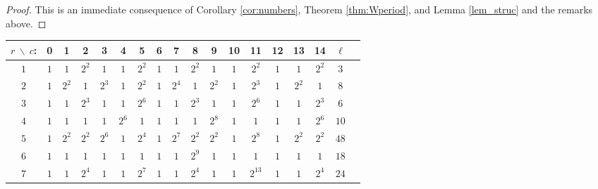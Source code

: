 \begin{proof}
This is an immediate consequence of Corollary \ref{cor:numbers},
Theorem \ref{thm:Wperiod}, and Lemma \ref{lem_struc} and the remarks
above.
\end{proof}

\begin{table}\label{tab:n4}
  \begin{center}
    \begin{adjustbox}{max width=\textwidth}
    \begin{tabular}{|c|cccccccccccccccc|c|}
      \hline
$r\ \backslash\ c$:&0 &1 &2 &3 &4 &5 &6 &7 &8 &9 &10 &11 &12 &13 &14  &$\ell$
\\
      \hline
$1$ &$1$ &$1$ &$2^2$ &$1$ &$1$ &$2^2$ &$1$ &$1$ &$2^2$ &$1$ &$1$ &$2^2$ &$1$ &$1$ &$2^2$ &$3$ \\
$2$ &$1$ &$2^2$ &$1$ &$2^3$ &$1$ &$2^2$ &$1$ &$2^4$ &$1$ &$2^2$ &$1$ &$2^3$ &$1$ &$2^2$ &$1$ &$8$ \\
$3$ &$1$ &$1$ &$2^3$ &$1$ &$1$ &$2^6$ &$1$ &$1$ &$2^3$ &$1$ &$1$ &$2^6$ &$1$ &$1$ &$2^3$ &$6$ \\
$4$ &$1$ &$1$ &$1$ &$1$ &$2^6$ &$1$ &$1$ &$1$ &$1$ &$2^8$ &$1$ &$1$ &$1$ &$1$ &$2^6$ &$10$ \\
$5$ &$1$ &$2^2$ &$2^2$ &$2^6$ &$1$ &$2^4$ &$1$ &$2^7$ &$2^2$ &$2^2$ &$1$ &$2^8$ &$1$ &$2^2$ &$2^2$ &$48$ \\
$6$ &$1$ &$1$ &$1$ &$1$ &$1$ &$1$ &$1$ &$1$ &$2^9$ &$1$ &$1$ &$1$ &$1$ &$1$ &$1$ &$18$ \\
$7$ &$1$ &$1$ &$2^4$ &$1$ &$1$ &$2^7$ &$1$ &$1$ &$2^4$ &$1$ &$1$ &$2^{13}$ &$1$ &$1$ &$2^4$ &$24$ \\

\end{tabular}
\end{adjustbox}
\end{center}
\end{table}
